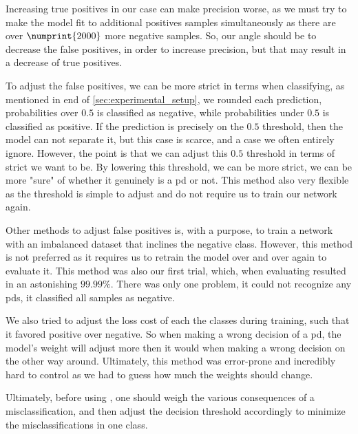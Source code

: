 Increasing true positives in our case can make precision worse, as we must try to make the model fit to additional positives samples simultaneously as there are over $\numprint{2000}$ more negative samples. So, our angle should be to decrease the false positives, in order to increase precision, but that may result in a decrease of true positives. 

To adjust the false positives, we can be more strict in terms when classifying, as mentioned in end of \autoref{sec:experimental_setup}, we rounded each prediction, probabilities over $0.5$ is classified as negative, while probabilities under $0.5$ is classified as positive. If the prediction is precisely on the $0.5$ threshold, then the model can not separate it, but this case is scarce, and a case we often entirely ignore. However, the point is that we can adjust this $0.5$ threshold in terms of strict we want to be. By lowering this threshold, we can be more strict, we can be more "sure" of whether it genuinely is a \ac{pd} or not. This method also very flexible as the threshold is simple to adjust and do not require us to train our network again.

Other methods to adjust false positives is, with a purpose, to train a network with an imbalanced dataset that inclines the negative class. However, this method is not preferred as it requires us to retrain the model over and over again to evaluate it. This method was also our first trial, which, when evaluating resulted in an astonishing $99.99\%$. There was only one problem, it could not recognize any \acp{pd}, it classified all samples as negative.

We also tried to adjust the loss cost of each the classes during training, such that it favored positive over negative. So when making a wrong decision of a \ac{pd}, the model's weight will adjust more then it would when making a wrong decision on the other way around. Ultimately, this method was error-prone and incredibly hard to control as we had to guess how much the weights should change.

Ultimately, before using \project, one should weigh the various consequences of a misclassification, and then adjust the decision threshold accordingly to minimize the misclassifications in one class.